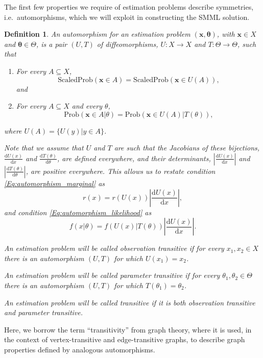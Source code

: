 \documentclass{IEEEtran}
\newtheorem{defi}{Definition}
\begin{document}
The first few properties we require of estimation problems
describe symmetries, i.e.\ automorphisms, which we will exploit in
constructing the SMML solution.

\begin{defi}\label{D:transitivity}
An \emph{automorphism} for
an estimation problem $(\mathbf{x},\boldsymbol{\theta})$, with
$\mathbf{x}\in X$ and $\boldsymbol{\theta}\in\Theta$, is a pair $(U,T)$ of
diffeomorphisms, $U:X\to X$ and $T:\Theta\to\Theta$, such that
\begin{enumerate}
\item For every $A\subseteq X$,
\begin{equation}\label{Eq:automorphism_marginal}
\text{ScaledProb}(\mathbf{x}\in A)=\text{ScaledProb}(\mathbf{x}\in U(A)),
\end{equation}
and
\item For every $A\subseteq X$ and every $\theta$,
\begin{equation}\label{Eq:automorphism_likelihood}
\text{Prob}(\mathbf{x}\in A|\theta)=\text{Prob}(\mathbf{x}\in U(A)|T(\theta)),
\end{equation}
\end{enumerate}
where $U(A)=\{U(y)|y\in A\}$.

Note that we assume that $U$ and $T$ are such
that the Jacobians of these bijections, $\frac{\text{d}U(x)}{\text{d}x}$ and
$\frac{\text{d}T(\theta)}{\text{d}\theta}$, are defined everywhere, and their
determinants, $\left|\frac{\text{d}U(x)}{\text{d}x}\right|$ and
$\left|\frac{\text{d}T(\theta)}{\text{d}\theta}\right|$, are positive
everywhere. This allows us to restate condition
\eqref{Eq:automorphism_marginal} as
\[
r(x)=r(U(x))\left|\frac{\text{d}U(x)}{\text{d}x}\right|,
\]
and condition \eqref{Eq:automorphism_likelihood} as
\[
f(x|\theta)=f(U(x)|T(\theta))\left|\frac{\text{d}U(x)}{\text{d}x}\right|.
\]

An estimation problem will be called \emph{observation transitive}
if for every $x_1,x_2 \in X$ there is an automorphism $(U,T)$
for which $U(x_1)=x_2$.

An estimation problem will be called \emph{parameter transitive}
if for every $\theta_1,\theta_2 \in \Theta$ there is an automorphism $(U,T)$
for which $T(\theta_1)=\theta_2$.

An estimation problem will be called \emph{transitive} if it is both
observation transitive and parameter transitive.
\end{defi}

Here, we borrow the term ``transitivity'' from graph theory, where it is
used, in the context of vertex-transitive and edge-transitive graphs, to
describe graph properties defined by analogous automorphisms.
\end{document}

